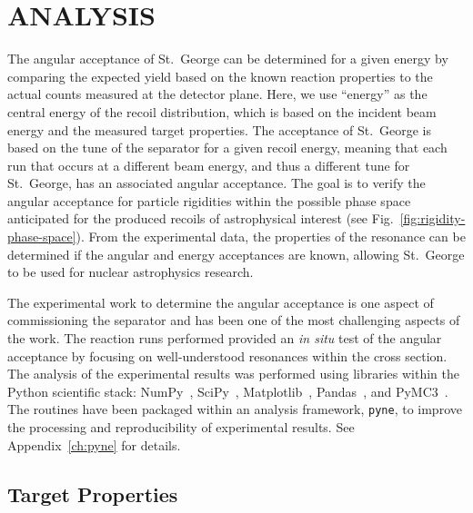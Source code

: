 
\chapter{ANALYSIS}
\label{ch:analysis}

The angular acceptance of St.\ George can be determined for a given
energy by comparing the expected yield based on the known reaction
properties to the actual counts measured at the detector plane. Here, we
use ``energy'' as the central energy of the recoil distribution, which
is based on the incident beam energy and the measured target properties.
The acceptance of St.\ George is based on the tune of the separator for
a given recoil energy, meaning that each run that occurs at a different
beam energy, and thus a different tune for St.\ George, has an
associated angular acceptance. The goal is to verify the angular
acceptance for particle rigidities within the possible phase space
anticipated for the produced recoils of astrophysical interest (see
Fig.~\ref{fig:rigidity-phase-space}). From the experimental data, the
properties of the resonance can be determined if the angular and energy
acceptances are known, allowing St.\ George to be used for nuclear
astrophysics research.

The experimental work to determine the angular acceptance is one aspect
of commissioning the separator and has been one of the most challenging
aspects of the work. The \alpa{} reaction runs performed provided an
\emph{in situ} test of the angular acceptance by focusing on
well-understood resonances within the cross section. The analysis of the
experimental results was performed using libraries within the Python
scientific stack: NumPy~\cite{NumPy}, SciPy~\cite{SciPy},
Matplotlib~\cite{Matplotlib}, Pandas~\cite{Pandas}, and
PyMC3~\cite{PyMC3}. The routines have been packaged within an analysis
framework, \verb+pyne+, to improve the processing and reproducibility of
experimental results. See Appendix~\ref{ch:pyne} for details.

\section{Target Properties}
\label{sec:target-properties}


